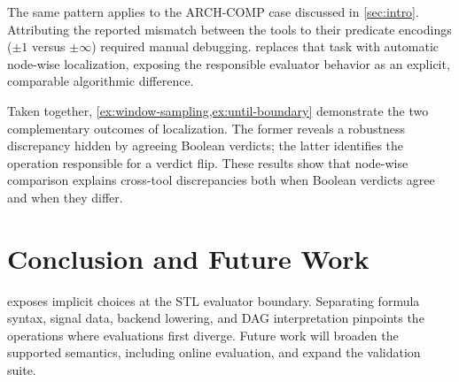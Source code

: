 The same pattern applies to the ARCH-COMP case discussed in \cref{sec:intro}.
Attributing the reported mismatch between the tools to their predicate
encodings ($\pm 1$ versus $\pm\infty$) required manual debugging. \tool
replaces that task with automatic node-wise localization, exposing the
responsible evaluator behavior as an explicit, comparable algorithmic
difference.

Taken together, \cref{ex:window-sampling,ex:until-boundary} demonstrate the two
complementary outcomes of localization. The former reveals a robustness
discrepancy hidden by agreeing Boolean verdicts; the latter identifies the
operation responsible for a verdict flip. These results show that node-wise
comparison explains cross-tool discrepancies both when Boolean verdicts agree
and when they differ.

\section{Conclusion and Future Work}
\label{sec:conclusion}
\tool exposes implicit choices at the STL evaluator boundary. Separating formula
syntax, signal data, backend lowering, and DAG interpretation pinpoints the
operations where evaluations first diverge. Future work will broaden the
supported semantics, including online evaluation, and expand the validation
suite.

